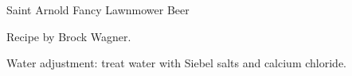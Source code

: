 \begin{recipe}{Saint Arnold Fancy Lawnmower Beer} %

\begin{aboutblock}
Recipe by Brock Wagner. 
\end{aboutblock}


\begin{methodandtiming}

\begin{mashsteps}
\end{mashsteps}

\begin{fermentationsteps}
\end{fermentationsteps}

\begin{directions}
Water adjustment: treat water with Siebel salts and calcium chloride.
\end{directions}

\end{methodandtiming}

\recipebreak

\begin{ingredientsblock}

\begin{malts}
\end{malts}

\begin{hops}
\end{hops}


\end{ingredientsblock}

\end{recipe}

